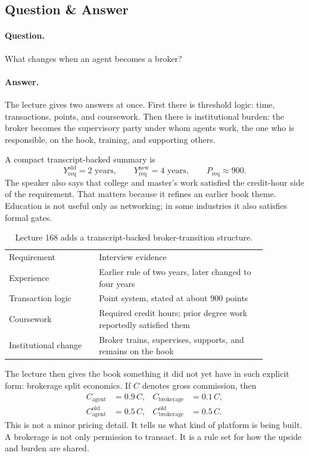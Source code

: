 \documentclass[11pt,oneside]{book}
\begin{document}
\subsection{Question \& Answer}

\paragraph{Question.}
What changes when an agent becomes a broker?

\paragraph{Answer.}
The lecture gives two answers at once. First there is threshold logic: time, transactions, points, and coursework. Then there is institutional burden: the broker becomes the supervisory party under whom agents work, the one who is responsible, on the hook, training, and supporting others.

A compact transcript-backed summary is
\begin{equation}
Y_{\mathrm{req}}^{\mathrm{old}} = 2 \text{ years},
\qquad
Y_{\mathrm{req}}^{\mathrm{new}} = 4 \text{ years},
\qquad
P_{\mathrm{req}} \approx 900.
\end{equation}
The speaker also says that college and master's work satisfied the credit-hour side of the requirement. That matters because it refines an earlier book theme. Education is not useful only as networking; in some industries it also satisfies formal gates.

\begin{table}[h]
\centering
\begin{tabular}{p{0.30\linewidth}p{0.56\linewidth}}
Requirement & Interview evidence \\
Experience & Earlier rule of two years, later changed to four years \\
Transaction logic & Point system, stated at about \(900\) points \\
Coursework & Required credit hours; prior degree work reportedly satisfied them \\
Institutional change & Broker trains, supervises, supports, and remains on the hook \\
\end{tabular}
\caption{Lecture 168 adds a transcript-backed broker-transition structure.}
\end{table}

The lecture then gives the book something it did not yet have in such explicit form: brokerage split economics. If \(C\) denotes gross commission, then
\begin{align}
C_{\mathrm{agent}} &= 0.9\,C,
&
C_{\mathrm{brokerage}} &= 0.1\,C,
\\
C_{\mathrm{agent}}^{\mathrm{old}} &= 0.5\,C,
&
C_{\mathrm{brokerage}}^{\mathrm{old}} &= 0.5\,C.
\end{align}
This is not a minor pricing detail. It tells us what kind of platform is being built. A brokerage is not only permission to transact. It is a rule set for how the upside and burden are shared.
\end{document}

